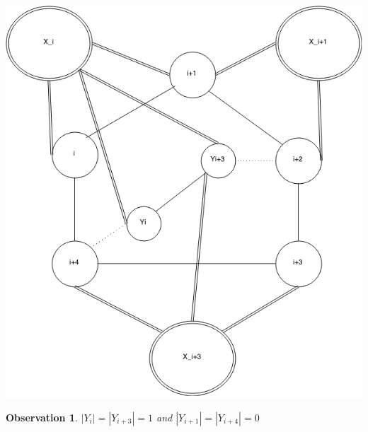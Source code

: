 \documentclass[12pt]{article}
\newtheorem{Observation}[Theorem]{Observation}
\begin{document}
\hfill
\begin{minipage}{0.5\textwidth}\raggedleft
	\includegraphics[width=\linewidth]{Yi1-Yi4.png}
\end{minipage}



\begin{Observation}\label{obs:yi-yi3} 
$|Y_{i}| = |Y_{i+3}| = 1$ and $|Y_{i+1}| = |Y_{i+4}| = 0$
\end{Observation}
\end{document}
